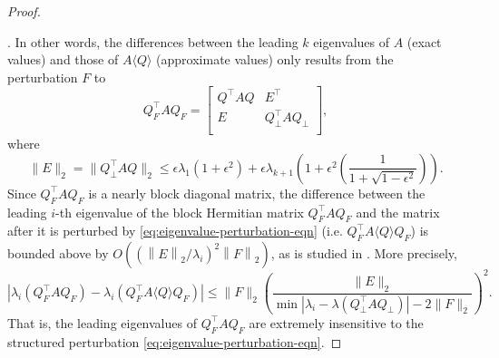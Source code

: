 \documentclass[onefignum,onetabnum]{siamart251216}
\begin{document}
\begin{proof}
{\begin{enumerate}
\end{enumerate}}. In other words, the differences between the leading $k$ eigenvalues of $A$ (exact values) and those of $A \langle Q \rangle$ (approximate values) only results from the perturbation $F$ to
\[
    Q_{F}^\top A Q_{F}
    =
    \begin{bmatrix}
        Q^\top A Q & E^\top \\
        E & Q_{\perp}^\top A Q_{\perp} \\
    \end{bmatrix},
\]
where
\[
    \|E\|_2 = \|Q_{\perp}^\top A Q\|_2 \leq \epsilon \lambda_1 \left(1 + \epsilon^2\right) + \epsilon \lambda_{k+1} \left(1 + \epsilon^2 \left(\frac{1}{1 + \sqrt{1 - \epsilon^2}}\right)\right).
\]
Since $Q_{F}^\top A Q_{F}$ is a nearly block diagonal matrix, the difference between the leading $i$-th eigenvalue of the block Hermitian matrix $Q_{F}^\top A Q_{F}$ and the matrix after it is perturbed by \eqref{eq:eigenvalue-perturbation-eqn} (i.e. $Q_{F}^\top A \langle Q \rangle Q_{F}$) is bounded above by $O\left( (\left\|E\right\|_2 / \lambda_{i})^2 \left\|F\right\|_2\right)$, as is studied in \cite[Theorem 3.2]{nakatsukasa2012eigenvalue}. More precisely,
\begin{equation}
    \label{eq:Nystrom-perturbation-eq}
    \left| \lambda_{i}(Q_{F}^\top A Q_{F}) - \lambda_{i}(Q_{F}^\top A \langle Q \rangle Q_{F}) \right|
    \leq
    \|F\|_2 \left(\frac{\|E\|_2}{\min|\lambda_i - \lambda(Q_{\perp}^\top A Q_{\perp})| - 2 \|F\|_2}\right)^2.
\end{equation}
That is, the leading eigenvalues of $Q_{F}^\top A Q_{F}$ are extremely insensitive to the structured perturbation \eqref{eq:eigenvalue-perturbation-eqn}. 


\end{proof}
\end{document}
